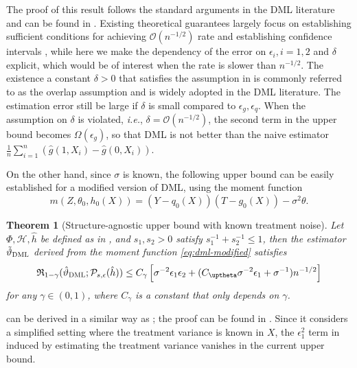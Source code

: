 \documentclass{article}
\def\eps{{\epsilon}}
\def\gH{{\mathcal{H}}}
\def\gO{{\mathcal{O}}}
\def\gP{{\mathcal{P}}}
\newtheorem{theorem}{Theorem}[section]
\newcommand{\dml}{\textsc{DML}}
\begin{document}
The proof of this result follows the standard arguments in the DML literature and can be found in . Existing theoretical guarantees largely focus on establishing sufficient conditions for achieving $\gO(n^{-1/2})$ rate and establishing confidence intervals \citep{chernozhukov2018double,chernozhukov2022automatic}, while here we make the dependency of the error on $\eps_i,i=1,2$ and $\delta$ explicit, which would be of interest when the rate is slower than $n^{-1/2}$. The existence a constant $\delta>0$ that satisfies the assumption in  is commonly referred to as the 
overlap assumption and is widely adopted in the DML literature. The estimation error still be large if $\delta$ is small compared to $\eps_g,\eps_q$. When the assumption on $\delta$ is violated, \emph{i.e.}, $\delta=\gO(n^{-1/2})$, the second term in the upper bound becomes $\Omega(\eps_g)$, so that DML is not better than the naive estimator $\frac{1}{n}\sum_{i=1}^n(\hat{g}(1,X_i)-\hat{g}(0,X_i))$. %

On the other hand, since $\sigma$ is known, the following upper bound can be easily established for a modified version of DML, using the moment function
\begin{equation}
\label{eq:dml-modified}
    m(Z,\theta_0,h_0(X)) = (Y-q_0(X))(T-g_0(X)) - \sigma^2\theta.
\end{equation}

\begin{theorem}[Structure-agnostic upper bound with known treatment noise]
    \label{thm:gaussian-upper-bound}
    Let $\Phi,\gH,\hat{h}$ be defined as in , and $s_1,s_2>0$ satisfy $s_1^{-1}+s_2^{-1}\leq 1$, then the estimator $\tilde{\vartheta}_{\dml}$ derived from the moment function \eqref{eq:dml-modified} satisfies $$\mathfrak{R}_{1-\gamma}(\hat{\vartheta}_{\dml};\gP_{s,\eps}(\hat{h}))\leq C_{\gamma}\left[\sigma^{-2}\eps_1\eps_2+(C_{\uptheta}\sigma^{-2}\eps_1+\sigma^{-1})n^{-1/2}\right]$$ for any $\gamma\in(0,1)$, where $C_{\gamma}$ is a constant that only depends on $\gamma$. 
\end{theorem}

 can be derived in a similar way as ; the proof can be found in . Since it considers a simplified setting where the treatment variance is known in $X$, the $\eps_1^2$ term in  induced by estimating the treatment variance vanishes in the current upper bound.
\end{document}

